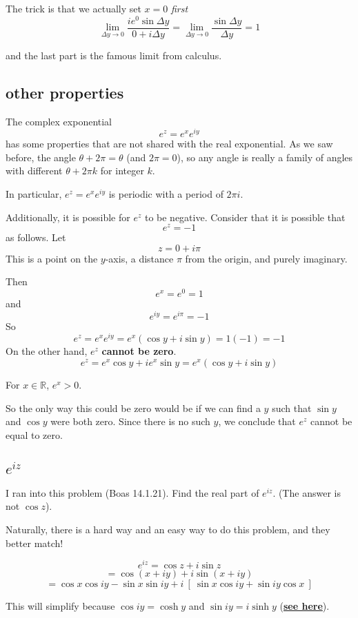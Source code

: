 \documentclass[11pt, oneside]{article}
\begin{document}
The trick is that we actually set $x = 0$ \emph{first}
\[ \lim_{\Delta y \rightarrow 0}  \frac{i  e^0 \sin \Delta y}{0 + i \Delta y} = \lim_{\Delta y \rightarrow 0}  \frac{\sin \Delta y}{\Delta y} = 1 \]

and the last part is the famous limit from calculus.

\subsection*{other properties}

The complex exponential 
\[ e^z = e^x e^{iy} \]
has some properties that are not shared with the real exponential.  As we saw before, the angle $\theta + 2 \pi = \theta$ (and $2 \pi = 0$), so any angle is really a family of angles with different $\theta + 2 \pi k$ for integer $k$.

In particular, $e^z = e^x e^{iy}$ is periodic with a period of $2 \pi i$.  

Additionally, it is possible for $e^z$ to be negative.  Consider that it is possible that
\[ e^z = -1 \]
as follows.  Let 
\[ z = 0 + i\pi \]
This is a point on the $y$-axis, a distance $\pi$ from the origin, and purely imaginary.

Then 
\[ e^x = e^0 = 1 \]
and
\[ e^{iy} = e^{i\pi} = -1 \]
So
\[ e^z = e^x e^{iy} = e^x(\cos y + i \sin y) = 1 (-1) = -1 \]
On the other hand, $e^z$ \textbf{cannot be zero}.
\[ e^z = e^x \cos y + i e^x \sin y = e^x(\cos y + i \sin y) \]

For $x \in \mathbb{R}$, $e^x > 0$.

So the only way this could be zero would be if we can find a $y$ such that $\sin y$ and $\cos y$ were both zero.  Since there is no such $y$, we conclude that $e^z$ cannot be equal to zero.

\subsection*{$e^{iz}$}
I ran into this problem (Boas 14.1.21).  Find the real part of $e^{iz}$.  (The answer is not $\cos z$).  

Naturally, there is a hard way and an easy way to do this problem, and they better match!

\[ e^{iz} = \cos z + i \sin z \]
\[ = \cos (x + iy) + i \sin (x + iy) \]
\[ = \cos x \cos iy - \sin x \sin iy + i \ [ \ \sin x \cos iy + \sin iy \cos x \ ] \]

This will simplify because $\cos iy = \cosh y$ and $\sin iy = i \sinh y$ (\hyperref[sec:hyperbolics]{\textbf{see here}}).
\end{document}
